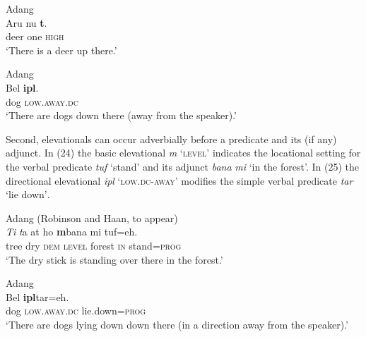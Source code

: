 \ea%
\label{ex:22}
  Adang \citep[192]{Haan2001}    \\
\gll  Aru   nu  \textbf{{t}}\textbf{{{\textopeno}}}\textbf{{{\ng}}}{.}  \\
   deer  one  \textsc{high}   \\
\glt   `There is a deer up there.'
\z









\ea%
\label{ex:23}
   Adang \citep[192]{Haan2001}   \\
\gll  Bel  \textbf{{ipl}}\textbf{{{\textepsilon}}}{.}  \\
  dog  \textsc{low.away.dc}    \\
\glt   `There are dogs down there (away from the speaker).'
\z







Second, elevationals can occur adverbially before a predicate and its (if any) adjunct. In (24) the basic elevational \textit{m}\textit{{\textopeno}}\textit{{\ng}} `\textsc{level}' indicates the locational setting for the verbal predicate \textit{tuf} `stand' and its adjunct \textit{bana} \textit{mi} `in the forest'. In (25) the directional elevational \textit{ipl}\textit{{\textepsilon}} \textsc{`low.dc-away'} modifies the simple verbal predicate \textit{tar} `lie down'\textsc{.}



\ea%
\label{ex:24}
     Adang (Robinson and Haan, to appear) \\
\gll  \textit{Ti} \textit ta {{\textglotstop}}{at}  ho  \textbf{{m}}\textbf{{{\textopeno}}}\textbf{{{\ng}}}{bana}  mi  {tuf=eh.} \\
    tree  dry  \textsc{dem} \textsc {level} forest  \textsc{in} stand=\textsc{prog} \\
\glt   `The dry stick is standing over there in the forest.'
\z









\ea%
\label{ex:25}
   Adang \citep[191]{Haan2001}   \\
\gll   Bel  \textbf{{ipl}}\textbf{{{\textepsilon}}}{tar=eh.} \\
   dog  \textsc{low.away.dc} lie.down=\textsc{prog}   \\
\glt   `There are dogs lying down down there (in a direction away from the speaker).'
\z







